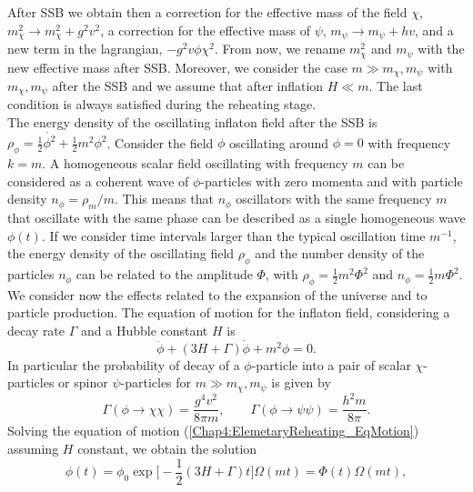 \documentclass[11pt,a4paper,twoside]{book}
\begin{document}
After SSB we obtain then a correction for the effective mass of the field $\chi$, $ m^{2}_{\chi} \rightarrow m^{2}_{\chi}+g^{2}v^{2} $, a correction for the effective mass of $\psi$, $ m_{\psi} \rightarrow m_{\psi} + hv $, and a new term in the lagrangian, $ -g^{2}v\phi \chi^{2} $. From now, we rename $ m^{2}_{\chi} $ and $ m_{\psi} $ with the new effective mass after SSB. Moreover, we consider the case $ m \gg m_{\chi}, m_{\psi} $ with $ m_{\chi},m_{\psi} $ after the SSB and we assume that after inflation $ H \ll m $. The last condition is always satisfied during the reheating stage.\\
The energy density of the oscillating inflaton field after the SSB is $ \rho_{\phi} = \frac{1}{2}\dot{\phi^{2}} + \frac{1}{2}m^{2}\phi^{2}$. Consider the field $\phi$ oscillating around $\phi=0$ with frequency $ k=m $. A homogeneous scalar field oscillating with frequency $ m $ can be considered as a coherent wave of $ \phi $-particles with zero momenta and with particle density $ n_{\phi}=\rho_{m}/m $. This means that $ n_{\phi} $ oscillators with the same frequency $ m $ that oscillate with the same phase can be described as a single homogeneous wave $\phi(t)$. If we consider time intervals larger than the typical oscillation time $ m^{-1} $, the energy density of the oscillating field $\rho_{\phi}$ and the number density of the particles $ n_{\phi} $ can be related to the amplitude $\Phi$, with $\rho_{\phi}=\frac{1}{2}m^{2}\Phi^{2}$ and $ n_{\phi}=\frac{1}{2}m\Phi^{2} $.\\
We consider now the effects related to the expansion of the universe and to particle production. The equation of motion for the inflaton field, considering a decay rate $ \Gamma $ and a Hubble constant $ H $ is
\begin{equation}
	\label{Chap4:ElemetaryReheating_EqMotion}
	\ddot{\phi} + (3H + \Gamma)\dot{\phi} + m^{2}\phi = 0.
\end{equation}
In particular the probability of decay of a $ \phi $-particle into a pair of scalar $ \chi $-particles or spinor $ \psi $-particles for $ m \gg m_{\chi},m_{\psi} $ is given by \cite{Chap4:LindePreheatingModel}
\begin{equation}
	\label{Chap4:ElemReheating_DecayRate}
	\Gamma(\phi \rightarrow \chi \chi) = \frac{g^{4}v^{2}}{8\pi m},
	\qquad
	\Gamma(\phi \rightarrow \psi \psi) = \frac{h^{2}m}{8\pi}.
\end{equation}
Solving the equation of motion (\ref{Chap4:ElemetaryReheating_EqMotion}) assuming $ H $ constant, we obtain the solution
\begin{equation}
	\label{Chap4:ElemReheating_solution}
	\phi(t)=\phi_{0}\exp\Big[-\frac{1}{2}(3H+\Gamma)t\Big]\Omega(mt)=\Phi(t)\Omega(mt),
\end{equation}
\end{document}
